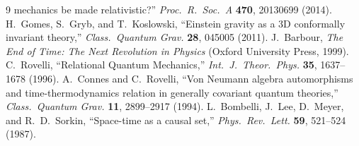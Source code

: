 \documentclass[11pt]{article}
\begin{document}
\begin{thebibliography}{9}
  mechanics be made relativistic?'' \emph{Proc.\ R.\ Soc.\ A} \textbf{470}, 20130699 (2014).
 H.~Gomes, S.~Gryb, and T.~Koslowski, ``Einstein gravity as a 3D
  conformally invariant theory,'' \emph{Class.\ Quantum Grav.} \textbf{28}, 045005 (2011).
 J.~Barbour, \emph{The End of Time: The Next Revolution in Physics}
  (Oxford University Press, 1999).
 C.~Rovelli, ``Relational Quantum Mechanics,''
  \emph{Int.\ J.\ Theor.\ Phys.} \textbf{35}, 1637--1678 (1996).
 A.~Connes and C.~Rovelli, ``Von Neumann algebra automorphisms and
  time-thermodynamics relation in generally covariant quantum theories,''
  \emph{Class.\ Quantum Grav.} \textbf{11}, 2899--2917 (1994).
 L.~Bombelli, J.~Lee, D.~Meyer, and R.~D.~Sorkin, ``Space-time as a causal set,''
  \emph{Phys.\ Rev.\ Lett.} \textbf{59}, 521--524 (1987).
\end{thebibliography}
\endgroup
\end{document}
